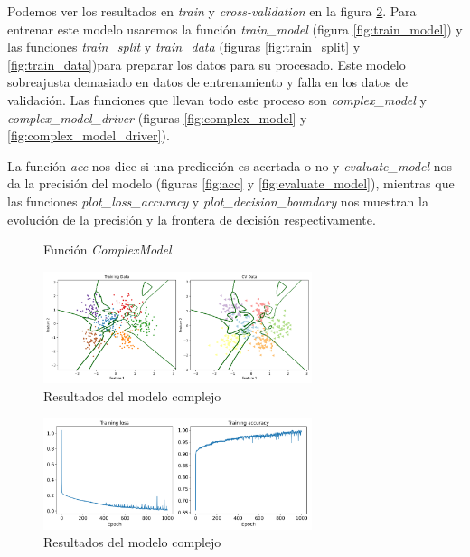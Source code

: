 \documentclass[6pt]{../../shared/AiTex}
\begin{document}
Podemos ver los resultados en \textit{train} y \textit{cross-validation} en la figura \ref{fig:complex_results}. Para entrenar este modelo usaremos la función \textit{train\_model} (figura \ref{fig:train_model}) y las funciones \textit{train\_split} y \textit{train\_data}  (figuras \ref{fig:train_split} y \ref{fig:train_data})para preparar los datos para su procesado. Este modelo sobreajusta demasiado en datos de entrenamiento y falla en los datos de validación. Las funciones que llevan todo este proceso son \textit{complex\_model} y \textit{complex\_model\_driver} (figuras \ref{fig:complex_model} y \ref{fig:complex_model_driver}).

La función \textit{acc} nos dice si una predicción es acertada o no y \textit{evaluate\_model} nos da la precisión del modelo (figuras \ref{fig:acc} y \ref{fig:evaluate_model}), mientras que las funciones \textit{plot\_loss\_accuracy} y \textit{plot\_decision\_boundary} nos muestran la evolución de la precisión y la frontera de decisión respectivamente.

\begin{figure}[H]
    \centering
    
    \caption{Función \textit{ComplexModel}}
    \label{fig:ComplexModel}
\end{figure}

\begin{figure}[H]
    \centering
    \includegraphics[width=0.7\textwidth]{./images/decision_boundary_complex.png}
    \caption{Resultados del modelo complejo}
\end{figure}

\begin{figure}[H]
    \centering
    \includegraphics[width=0.7\textwidth]{./images/loss_accuracy_complex.png}
    \caption{Resultados del modelo complejo}
    \label{fig:complex_results}
\end{figure}
\end{document}
